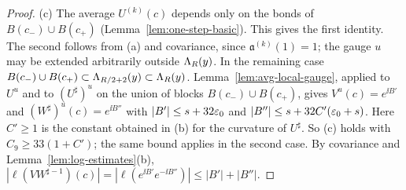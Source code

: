 \begin{proof}
(c) The average $U^{(k)}(c)$ depends only on the bonds of $B(c_-)\cup B(c_+)$ (Lemma~\ref{lem:one-step-basic}). This gives the first identity. The second follows from (a) and covariance, since $\mathfrak a^{(k)}(1)=1$; the gauge $u$ may be extended arbitrarily outside $\Lambda_R(y)$. In the remaining case $B(c_-)\cup B(c_+)\subset\Lambda_{R/2+2}(y)\subset\Lambda_R(y)$. Lemma~\ref{lem:avg-local-gauge}, applied to $U^u$ and to $(U^\sharp)^u$ on the union of blocks $B(c_-)\cup B(c_+)$, gives $V^u(c)=e^{\ii B'}$ and $(W^\sharp)^u(c)=e^{\ii B''}$ with $|B'|\le s+32\varepsilon_0$ and $|B''|\le s+32C'(\varepsilon_0+s)$. Here $C'\ge1$ is the constant obtained in (b) for the curvature of $U^\sharp$. So (c) holds with $C_9\ge33(1+C')$; the same bound applies in the second case. By covariance and Lemma~\ref{lem:log-estimates}(b), $|\ell(VW^{\sharp-1})(c)|=|\ell(e^{\ii B'}e^{-\ii B''})|\le|B'|+|B''|$.
\end{proof}
